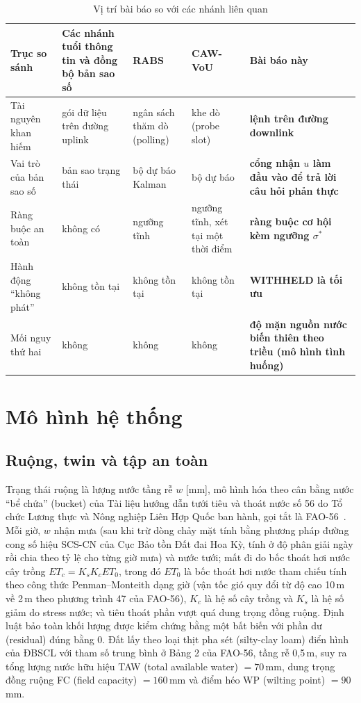\documentclass[10pt]{article}
\begin{document}
\begin{table}[h]
\centering
\caption{Vị trí bài báo so với các nhánh liên quan}
\label{tab:gap}
\footnotesize
\begin{tabularx}{\textwidth}{@{}>{\raggedright}p{2.4cm} >{\raggedright\arraybackslash}X >{\raggedright\arraybackslash}X >{\raggedright\arraybackslash}X >{\raggedright\arraybackslash}X@{}}
\toprule
Trục so sánh & Các nhánh tuổi thông tin và đồng bộ bản sao số & RABS~\cite{rabs} & CAW-VoU~\cite{cawvou} & Bài báo này \\
\midrule
Tài nguyên khan hiếm & gói dữ liệu trên đường uplink & ngân sách thăm dò (polling) & khe dò (probe slot) & \textbf{lệnh trên đường downlink} \\
Vai trò của bản sao số & bản sao trạng thái & bộ dự báo Kalman & bộ dự báo & \textbf{cổng nhận $u$ làm đầu vào để trả lời câu hỏi phản thực} \\
Ràng buộc an toàn & không có & ngưỡng tĩnh & ngưỡng tĩnh, xét tại một thời điểm & \textbf{ràng buộc cơ hội kèm ngưỡng $\sigma^{*}$} \\
Hành động ``không phát'' & không tồn tại & không tồn tại & không tồn tại & \textbf{WITHHELD là tối ưu} \\
Mối nguy thứ hai & không & không & không & \textbf{độ mặn nguồn nước biến thiên theo triều (mô hình tình huống)} \\
\bottomrule
\end{tabularx}
\end{table}

\section{Mô hình hệ thống}

\subsection{Ruộng, twin và tập an toàn}

Trạng thái ruộng là lượng nước tầng rễ $w$ [mm], mô hình hóa theo cân bằng nước ``bể chứa'' (bucket) của Tài liệu hướng dẫn tưới tiêu và thoát nước số 56 do Tổ chức Lương thực và Nông nghiệp Liên Hợp Quốc ban hành, gọi tắt là FAO-56~\cite{fao56}. Mỗi giờ, $w$ nhận mưa (sau khi trừ dòng chảy mặt tính bằng phương pháp đường cong số hiệu SCS-CN của Cục Bảo tồn Đất đai Hoa Kỳ, tính ở độ phân giải ngày rồi chia theo tỷ lệ cho từng giờ mưa) và nước tưới; mất đi do bốc thoát hơi nước cây trồng $ET_c = K_s K_c ET_0$, trong đó $ET_0$ là bốc thoát hơi nước tham chiếu tính theo công thức Penman--Monteith dạng giờ (vận tốc gió quy đổi từ độ cao 10\,m về 2\,m theo phương trình 47 của FAO-56), $K_c$ là hệ số cây trồng và $K_s$ là hệ số giảm do stress nước; và tiêu thoát phần vượt quá dung trọng đồng ruộng. Định luật bảo toàn khối lượng được kiểm chứng bằng một bất biến với phần dư (residual) đúng bằng 0. Đất lấy theo loại thịt pha sét (silty-clay loam) điển hình của ĐBSCL với tham số trung bình ở Bảng 2 của FAO-56, tầng rễ 0,5\,m, suy ra tổng lượng nước hữu hiệu TAW (total available water) $= 70$\,mm, dung trọng đồng ruộng FC (field capacity) $= 160$\,mm và điểm héo WP (wilting point) $= 90$\,mm.
\end{document}
